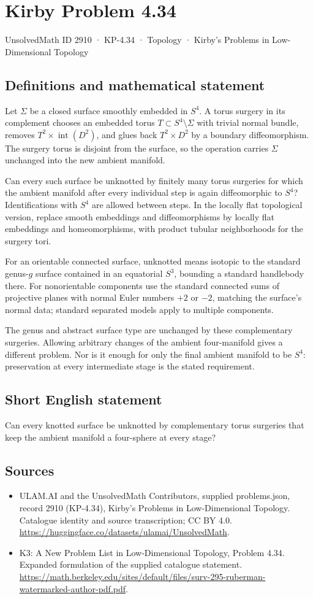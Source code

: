 \documentclass[11pt,a4paper]{article}
\begin{document}
\section*{Kirby Problem 4.34}\label{2910}
{\small UnsolvedMath ID 2910 · KP-4.34 · Topology · Kirby's Problems in Low-Dimensional Topology}
\subsection{Definitions and mathematical statement}
Let $\Sigma$ be a closed surface smoothly embedded in $S^4$. A torus surgery in its complement chooses an embedded torus $T\subset S^4\setminus\Sigma$ with trivial normal bundle, removes $T^2\times\operatorname{int}(D^2)$, and glues back $T^2\times D^2$ by a boundary diffeomorphism. The surgery torus is disjoint from the surface, so the operation carries $\Sigma$ unchanged into the new ambient manifold.

Can every such surface be unknotted by finitely many torus surgeries for which the ambient manifold after every individual step is again diffeomorphic to $S^4$? Identifications with $S^4$ are allowed between steps. In the locally flat topological version, replace smooth embeddings and diffeomorphisms by locally flat embeddings and homeomorphisms, with product tubular neighborhoods for the surgery tori.

For an orientable connected surface, unknotted means isotopic to the standard genus-$g$ surface contained in an equatorial $S^3$, bounding a standard handlebody there. For nonorientable components use the standard connected sums of projective planes with normal Euler numbers $+2$ or $-2$, matching the surface's normal data; standard separated models apply to multiple components.

The genus and abstract surface type are unchanged by these complementary surgeries. Allowing arbitrary changes of the ambient four-manifold gives a different problem. Nor is it enough for only the final ambient manifold to be $S^4$: preservation at every intermediate stage is the stated requirement.
\subsection{Short English statement}
Can every knotted surface be unknotted by complementary torus surgeries that keep the ambient manifold a four-sphere at every stage?
\subsection{Sources}
\begin{itemize}
\item[S1] ULAM.AI and the UnsolvedMath Contributors, supplied problems.json, record 2910 (KP-4.34), Kirby's Problems in Low-Dimensional Topology. Catalogue identity and source transcription; CC BY 4.0.
\url{https://huggingface.co/datasets/ulamai/UnsolvedMath}.
\item[S2] K3: A New Problem List in Low-Dimensional Topology, Problem 4.34. Expanded formulation of the supplied catalogue statement.
\url{https://math.berkeley.edu/sites/default/files/surv-295-ruberman-watermarked-author-pdf.pdf}.
\end{itemize}
\end{document}
